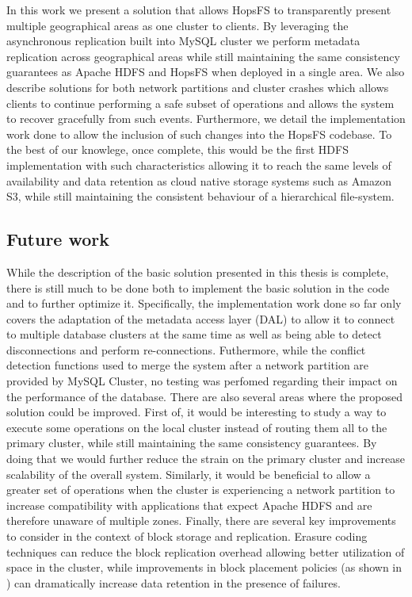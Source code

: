 In this work we present a solution that allows HopsFS to transparently present multiple geographical areas as one cluster to clients.
By leveraging the asynchronous replication built into MySQL cluster we perform metadata replication across geographical areas while still maintaining the same consistency guarantees as Apache HDFS and HopsFS when deployed in a single area.
We also describe solutions for both network partitions and cluster crashes which allows clients to continue performing a safe subset of operations and allows the system to recover gracefully from such events.
Furthermore, we detail the implementation work done to allow the inclusion of such changes into the HopsFS codebase.
To the best of our knowlege, once complete, this would be the first HDFS implementation with such characteristics allowing it to reach the same levels of availability and data retention as cloud native storage systems such as Amazon S3, while still maintaining the consistent behaviour of a hierarchical file-system.
\subsection{Future work}
While the description of the basic solution presented in this thesis is complete, there is still much to be done both to implement the basic solution in the code and to further optimize it.
Specifically, the implementation work done so far only covers the adaptation of the metadata access layer (DAL) to allow it to connect to multiple database clusters at the same time as well as being able to detect disconnections and perform re-connections.
Futhermore, while the conflict detection functions used to merge the system after a network partition are provided by MySQL Cluster, no testing was perfomed regarding their impact on the performance of the database.
There are also several areas where the proposed solution could be improved.
First of, it would be interesting to study a way to execute some operations on the local cluster instead of routing them all to the primary cluster, while still maintaining the same consistency guarantees.
By doing that we would further reduce the strain on the primary cluster and increase scalability of the overall system.
Similarly, it would be beneficial to allow a greater set of operations when the cluster is experiencing a network partition to increase compatibility with applications that expect Apache HDFS and are therefore unaware of multiple zones.
Finally, there are several key improvements to consider in the context of block storage and replication.
Erasure coding techniques \cite{DBLP:conf/usenix/HuangSXOCG0Y12,grohsschmiedt2014making} can reduce the block replication overhead allowing better utilization of space in the cluster, while improvements in block placement policies (as shown in \cite{DBLP:conf/usenix/CidonRSKOR13}) can dramatically increase data retention in the presence of failures.